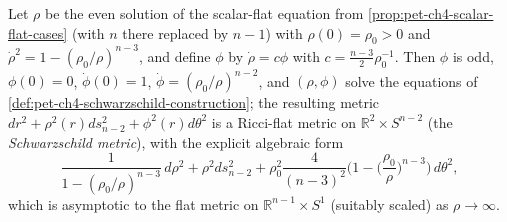 \begin{proposition}
  \label{prop:pet-ch4-schwarzschild-ricci-flat}
  Let $\rho$ be the even solution of the scalar-flat equation from
  \cref{prop:pet-ch4-scalar-flat-cases} (with $n$ there replaced by $n-1$) with
  $\rho(0)=\rho_0>0$ and $\dot\rho^2=1-(\rho_0/\rho)^{n-3}$, and define $\phi$ by
  $\dot\rho=c\phi$ with $c=\tfrac{n-3}2\rho_0^{-1}$. Then $\phi$ is odd,
  $\phi(0)=0$, $\dot\phi(0)=1$, $\dot\phi=(\rho_0/\rho)^{n-2}$, and $(\rho,\phi)$
  solve the equations of \cref{def:pet-ch4-schwarzschild-construction}; the
  resulting metric $dr^2+\rho^2(r)ds_{n-2}^2+\phi^2(r)d\theta^2$ is a Ricci-flat
  metric on $\mathbb{R}^2\times S^{n-2}$ (the \emph{Schwarzschild metric}), with the
  explicit algebraic form
  \[
    \frac1{1-(\rho_0/\rho)^{n-3}}\,d\rho^2+\rho^2ds_{n-2}^2
    +\rho_0^2\frac4{(n-3)^2}\Big(1-\Big(\frac{\rho_0}\rho\Big)^{n-3}\Big)\,d\theta^2,
  \]
  which is asymptotic to the flat metric on $\mathbb{R}^{n-1}\times S^1$ (suitably
  scaled) as $\rho\to\infty$.
\end{proposition}
